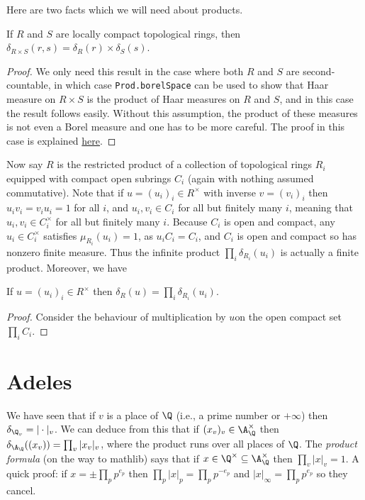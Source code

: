 Here are two facts which we will need about products.

\begin{lemma}
  \label{distribHaarChar_prod}
  If $R$ and $S$ are locally compact topological rings, then $\delta_{R\times S}(r,s)=\delta_R(r)\times\delta_S(s)$.
\end{lemma}
\begin{proof}
  We only need this result in the case where both $R$ and $S$ are second-countable, in which case
  {\tt Prod.borelSpace} can be used to show that Haar measure on $R\times S$ is the product of
  Haar measures on $R$ and $S$, and in this case the result follows easily. Without this assumption,
  the product of these measures is not even a Borel measure and one has to be more careful.
  The proof in this case is explained \href{https://leanprover.zulipchat.com/#narrow/channel/116395-maths/topic/Product.20of.20Borel.20spaces/near/487257981}{here}.
\end{proof}

Now say $R$ is the restricted product of a collection of topological rings $R_i$
  equipped with compact open subrings $C_i$ (again with nothing assumed commutative).
  Note that if $u=(u_i)_i\in R^\times$ with inverse $v=(v_i)_i$ then $u_iv_i=v_iu_i=1$
  for all $i$, and $u_i,v_i\in C_i$ for all but finitely many $i$, meaning that $u_i,v_i\in C_i^\times$
  for all but finitely many $i$. Because $C_i$ is open and compact, any $u_i\in C_i^\times$ satisfies
  $\mu_{R_i}(u_i)=1$, as $u_iC_i=C_i$, and $C_i$ is open and compact so has nonzero finite measure.
  Thus the infinite product $\prod_i\delta_{R_i}(u_i)$ is actually a finite product. Moreover,
  we have

\begin{lemma}
  \label{distribHaarChar_restricted_product}
  If $u=(u_i)_i\in R^\times$ then $\delta_R(u)=\prod_i\delta_{R_i}(u_i)$.
\end{lemma}
\begin{proof}
  Consider the behaviour of multiplication by $u$on the open compact set $\prod_i C_i$.
\end{proof}

\section{Adeles}

  We have seen that if $v$ is a place of $\Q$ (i.e., a prime
  number or $+\infty$) then $\delta_{\Q_v}=|\cdot|_v$.
  We can deduce from this that if $(x_v)_v\in\A_{\Q}^\times$
  then $\delta_{\A_{\Q}}((x_v))=\prod_v|x_v|_v$, where the product
  runs over all places of $\Q$.
  The \emph{product formula} (on the way to mathlib) says
  that if $x\in\Q^\times\subseteq\A_{\Q}^\times$ then $\prod_v|x|_v=1.$
  A quick proof: if $x=\pm\prod_pp^{e_p}$ then $\prod_p|x|_p=\prod_pp^{-e_p}$
  and $|x|_\infty=\prod_pp^{e_p}$ so they cancel.

